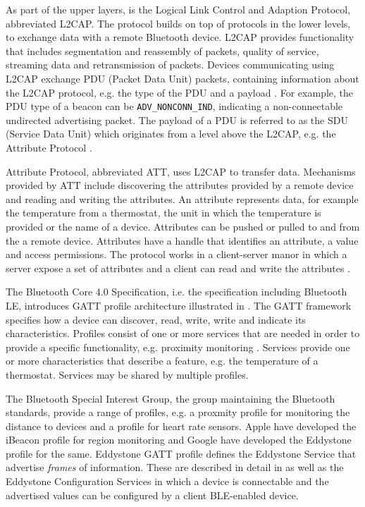 As part of the upper layers, is the Logical Link Control and Adaption Protocol, abbreviated L2CAP. The protocol builds on top of protocols in the lower levels, to exchange data with a remote Bluetooth device. L2CAP provides functionality that includes segmentation and reassembly of packets, quality of service, streaming data and retransmission of packets. Devices communicating using L2CAP exchange PDU (Packet Data Unit) packets, containing information about the L2CAP protocol, e.g. the type of the PDU and a payload \cite[pp. 80-83]{gupta2013inside}. For example, the PDU type of a beacon can be \texttt{ADV\_NONCONN\_IND}, indicating a non-connectable undirected advertising packet. The payload of a PDU is referred to as the SDU (Service Data Unit) which originates from a level above the L2CAP, e.g. the Attribute Protocol \cite[p. 201]{gupta2013inside}.

Attribute Protocol, abbreviated ATT, uses L2CAP to transfer data. Mechanisms provided by ATT include discovering the attributes provided by a remote device and reading and writing the attributes. An attribute represents data, for example the temperature from a thermostat, the unit in which the temperature is provided or the name of a device. Attributes can be pushed or pulled to and from the a remote device. Attributes have a handle that identifies an attribute, a value and access permissions. The protocol works in a client-server manor in which a server expose a set of attributes and a client can read and write the attributes \cite{gupta2013inside}.

The Bluetooth Core 4.0 Specification, i.e. the specification including Bluetooth LE, introduces GATT profile architecture illustrated in . The GATT framework specifies how a device can discover, read, write, write and indicate its characteristics. Profiles consist of one or more services that are needed in order to provide a specific functionality, e.g. proximity monitoring \cite[p. 259-261]{gupta2013inside}. Services provide one or more characteristics that describe a feature, e.g. the temperature of a thermostat. Services may be shared by multiple profiles.

The Bluetooth Special Interest Group, the group maintaining the Bluetooth standards, provide a range of profiles, e.g. a proxmity profile for monitoring the distance to devices and a profile for heart rate sensors. Apple have developed the iBeacon profile for region monitoring and Google have developed the Eddystone profile for the same. Eddystone GATT profile defines the Eddystone Service that advertise \emph{frames} of information. These are described in detail in  as well as the Eddystone Configuration Services in which a device is connectable and the advertised values can be configured by a client BLE-enabled device.

